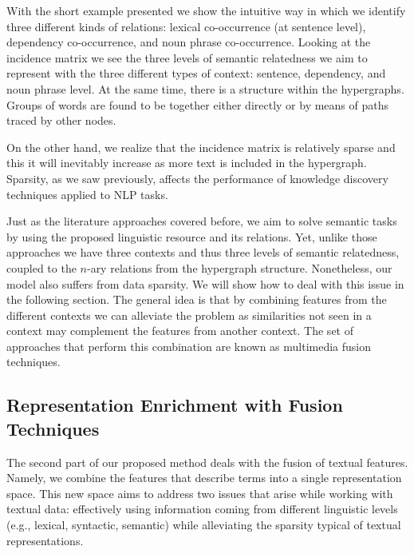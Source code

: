 With the short example presented we show the intuitive way in which we identify three different kinds of relations: lexical co-occurrence (at sentence level), dependency co-occurrence, and noun phrase co-occurrence. Looking at the incidence matrix we see the three levels of semantic relatedness we aim to represent with the three different types of context: sentence, dependency, and noun phrase level. At the same time, there is a structure within the hypergraphs. Groups of words are found to be together either directly or by means of paths traced by other nodes. 

On the other hand, we realize that the incidence matrix is relatively sparse and this it will inevitably increase as more text is included in the hypergraph. Sparsity, as we saw previously, affects the performance of knowledge discovery techniques applied to NLP tasks. 

Just as the literature approaches covered before, we aim to solve semantic tasks by using the proposed linguistic resource and its relations. Yet, unlike those approaches we have three contexts and thus three levels of semantic relatedness, coupled to the $n$-ary relations from the hypergraph structure. Nonetheless, our model also suffers from data sparsity. We will show how to deal with this issue in the following section. The general idea is that by combining features from the different contexts we can alleviate the problem as similarities not seen in a context may complement the features from another context. The set of approaches that perform this combination are known as multimedia fusion techniques.




                                                                                            
\subsection{Representation Enrichment with Fusion Techniques}\label{sec:fusion}
 
The second part of our proposed method deals with the fusion of textual features. Namely, we combine the features that describe terms into a single representation space. This new space aims to address two issues that arise while working with textual data: effectively using information coming from different linguistic levels (e.g., lexical, syntactic, semantic) while alleviating the sparsity typical of textual representations.


